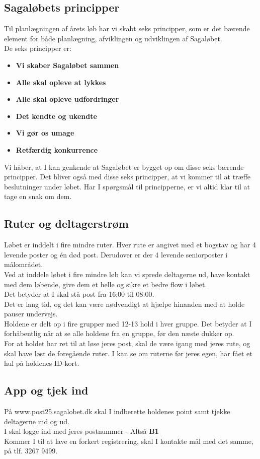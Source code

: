 \subsection{Sagaløbets principper}
Til planlægningen af årets løb har vi skabt seks principper, som er det bærende element for både planlægning, afviklingen og udviklingen af Sagaløbet.\\
De seks principper er:
\begin{itemize}
  \item \textbf{Vi skaber Sagaløbet sammen}
  \item \textbf{Alle skal opleve at lykkes}
  \item \textbf{Alle skal opleve udfordringer}
  \item \textbf{Det kendte og ukendte}
  \item \textbf{Vi gør os umage}
  \item \textbf{Retfærdig konkurrence}
\end{itemize}
Vi håber, at I kan genkende at Sagaløbet er bygget op om disse seks bærende principper. Det bliver også med disse seks principper, at vi kommer til at træffe beslutninger under løbet. Har I spørgsmål til principperne, er vi altid klar til at tage en snak om dem.
\subsection{Ruter og deltagerstrøm}
Løbet er inddelt i fire mindre ruter. Hver rute er angivet med et bogstav og har 4 levende poster og én død post. Derudover er der 4 levende seniorposter i målområdet.\\
Ved at inddele løbet i fire mindre løb kan vi sprede deltagerne ud, have kontakt med dem løbende, give dem et helle og sikre et bedre flow i løbet.\\
\newline
Det betyder at I skal stå post fra 16:00 til 08:00.\\
Det er lang tid, og det kan være nødvendigt at hjælpe hinanden med at holde pauser undervejs.\\
\newline
Holdene er delt op i fire grupper med 12-13 hold i hver gruppe. Det betyder at I forhåbentlig når at se alle holdene fra en gruppe, før den næste dukker op.\\
For at holdet har ret til at løse jeres post, skal de være igang med jeres rute, og skal have løst de foregående ruter. I kan se om ruterne før jeres egen, har fået et hul på holdenes ID-kort.
\subsection{App og tjek ind}
På www.post25.sagalobet.dk skal I indberette holdenes point samt tjekke deltagerne ind og ud.\\
I skal logge ind med jeres postnummer - Altså \textbf{B1}\\
\newline
Kommer I til at lave en forkert registrering, skal I kontakte mål med det samme, på tlf. 3267 9499.
\newpage
\vspace*{.4cm}
